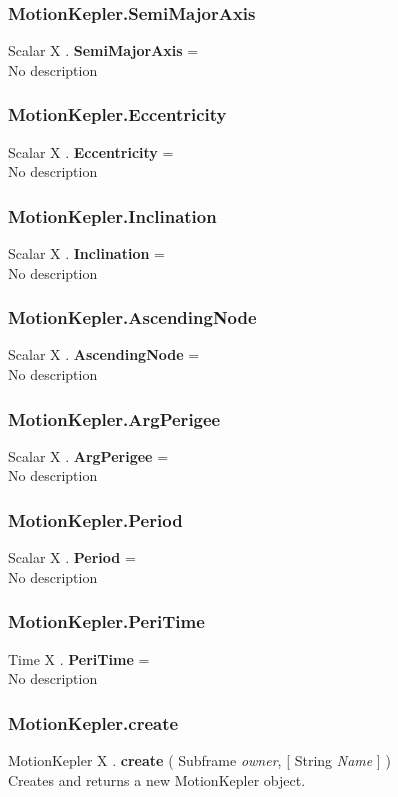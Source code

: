 \subsubsection{MotionKepler.SemiMajorAxis \label{F:MotionKepler:SemiMajorAxis}}
Scalar X . \textbf{SemiMajorAxis} = \\
No description

\subsubsection{MotionKepler.Eccentricity \label{F:MotionKepler:Eccentricity}}
Scalar X . \textbf{Eccentricity} = \\
No description

\subsubsection{MotionKepler.Inclination \label{F:MotionKepler:Inclination}}
Scalar X . \textbf{Inclination} = \\
No description

\subsubsection{MotionKepler.AscendingNode \label{F:MotionKepler:AscendingNode}}
Scalar X . \textbf{AscendingNode} = \\
No description

\subsubsection{MotionKepler.ArgPerigee \label{F:MotionKepler:ArgPerigee}}
Scalar X . \textbf{ArgPerigee} = \\
No description

\subsubsection{MotionKepler.Period \label{F:MotionKepler:Period}}
Scalar X . \textbf{Period} = \\
No description

\subsubsection{MotionKepler.PeriTime \label{F:MotionKepler:PeriTime}}
Time X . \textbf{PeriTime} = \\
No description

\subsubsection{MotionKepler.create \label{F:MotionKepler:create}}
MotionKepler X . \textbf{create} ( Subframe \textit{owner},  [ String \textit{Name} ] ) \\
Creates and returns a new MotionKepler object.

